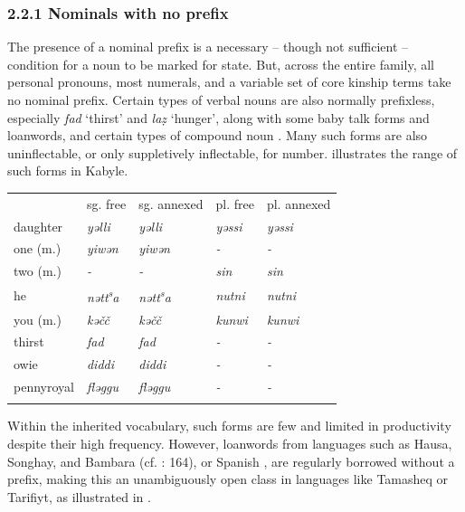 \documentclass[output=paper]{langscibook}
\begin{document}
\subsubsection{2.2.1 Nominals with no prefix}
\begin{styleStandarduser}
The presence of a nominal prefix is a necessary – though not sufficient – condition for a noun to be marked for state. But, across the entire family, all personal pronouns, most numerals, and a variable set of core kinship terms take no nominal prefix. Certain types of verbal nouns are also normally prefixless, especially \textit{fad} ‘thirst’ and \textit{laẓ} ‘hunger’, along with some baby talk forms and loanwords, and certain types of compound noun \citep[58]{Brugnatelli2006}. Many such forms are also uninflectable, or only suppletively inflectable, for number.  illustrates the range of such forms in Kabyle.
\end{styleStandarduser}

\begin{styleLangsciTableHeading}%
\begin{table}
\caption{Some prefixless nominals in Kabyle \citep{Dallet1982}}
\label{tab:key:6}
\end{table}\end{styleLangsciTableHeading}


\begin{tabularx}{\textwidth}{XXXXX}
 & sg. free & sg. annexed & pl. free & pl. annexed\\
\lsptoprule
daughter & \textit{yəlli} & \textit{yəlli} & \textit{yəssi} & \textit{yəssi}\\
one (m.) & \textit{yiwən} & \textit{yiwən} & \textit{{}-} & \textit{{}-}\\
two (m.) & \textit{{}-} & \textit{{}-} & \textit{sin} & \textit{sin}\\
he & \textit{nətt\textsuperscript{s}}\textit{a} & \textit{nətt\textsuperscript{s}}\textit{a} & \textit{nutni} & \textit{nutni}\\
you (m.) & \textit{kəčč} & \textit{kəčč} & \textit{kunwi} & \textit{kunwi}\\
thirst & \textit{fad} & \textit{fad} & \textit{{}-} & \textit{{}-}\\
owie & \textit{diddi} & \textit{diddi} & \textit{{}-} & \textit{{}-}\\
pennyroyal & \textit{fləggu} & \textit{fləggu} & \textit{{}-} & \textit{{}-}\\
\lspbottomrule
\end{tabularx}
\begin{styleStandarduser}
Within the inherited vocabulary, such forms are few and limited in productivity despite their high frequency. However, loanwords from languages such as Hausa, Songhay, and Bambara (cf. \citealt{Heath2005a}: 164), or Spanish \citep{Kossmann2009}, are regularly borrowed without a prefix, making this an unambiguously open class in languages like Tamasheq or Tarifiyt, as illustrated in .
\end{styleStandarduser}
\end{document}
